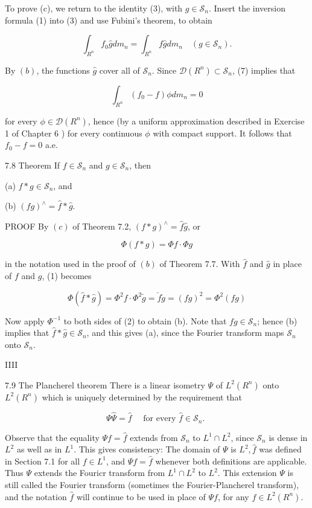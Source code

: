 \documentclass[10pt]{article}
\begin{document}
To prove (c), we return to the identity (3), with $g \in \mathscr{S}_{n}$. Insert the inversion formula (1) into (3) and use Fubini's theorem, to obtain

$$
\int_{R^{n}} f_{0} \hat{g} d m_{n}=\int_{R^{n}} f \hat{g} d m_{n} \quad\left(g \in \mathscr{S}_{n}\right) .
$$

By $(b)$, the functions $\hat{g}$ cover all of $\mathscr{S}_{n}$. Since $\mathscr{D}\left(R^{n}\right) \subset \mathscr{S}_{n}$, (7) implies that

$$
\int_{R^{n}}\left(f_{0}-f\right) \phi d m_{n}=0
$$

for every $\phi \in \mathscr{D}\left(R^{n}\right)$, hence (by a uniform approximation described in Exercise 1 of Chapter 6 ) for every continuous $\phi$ with compact support. It follows that $f_{0}-f=0$ a.e.

7.8 Theorem If $f \in \mathscr{S}_{n}$ and $g \in \mathscr{S}_{n}$, then

(a) $f * g \in \mathscr{S}_{n}$, and

(b) $(f g)^{\wedge}=\hat{f} * \hat{g}$.

PROOF By $(c)$ of Theorem 7.2, $(f * g)^{\wedge}=\hat{f} \hat{g}$, or

$$
\Phi(f * g)=\Phi f \cdot \Phi g
$$

in the notation used in the proof of $(b)$ of Theorem 7.7. With $\hat{f}$ and $\hat{g}$ in place of $f$ and $g$, (1) becomes

$$
\Phi(\hat{f} * \hat{g})=\Phi^{2} f \cdot \Phi^{2} \tilde{g}=\check{f} \check{g}=(f g)^{2}=\Phi^{2}(f g)
$$

Now apply $\Phi^{-1}$ to both sides of (2) to obtain (b). Note that $f g \in \mathscr{S}_{n}$; hence (b) implies that $\hat{f} * \hat{g} \in \mathscr{S}_{n}$, and this gives (a), since the Fourier transform maps $\mathscr{S}_{n}$ onto $\mathscr{S}_{n}$.

IIII

7.9 The Plancherel theorem There is a linear isometry $\Psi$ of $L^{2}\left(R^{n}\right)$ onto $L^{2}\left(R^{n}\right)$ which is uniquely determined by the requirement that

$$
\Psi \hat{\Psi}=\hat{f} \quad \text { for every } \hat{f} \in \mathscr{S}_{n} \text {. }
$$

Observe that the equality $\Psi f=\hat{f}$ extends from $\mathscr{S}_{n}$ to $L^{1} \cap L^{2}$, since $\mathscr{S}_{n}$ is dense in $L^{2}$ as well as in $L^{1}$. This gives consistency: The domain of $\Psi$ is $L^{2}, \hat{f}$ was defined in Section 7.1 for all $f \in L^{1}$, and $\Psi f=\hat{f}$ whenever both definitions are applicable. Thus $\Psi$ extends the Fouricr transform from $L^{1} \cap L^{2}$ to $L^{2}$. This extension $\Psi$ is still called the Fourier transform (sometimes the Fourier-Plancherel transform), and the notation $\hat{f}$ will continue to be used in place of $\Psi f$, for any $f \in L^{2}\left(R^{n}\right)$.
\end{document}
